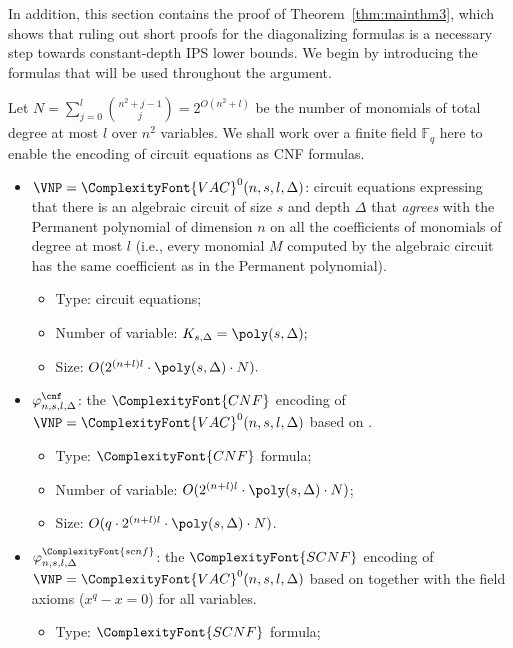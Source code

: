 \documentclass[11pt,letter]{article}
\theoremstyle{remark} %
\newcommand{\CNF}{ %
    {
        \ComplexityFont{CNF}
    }
}
\newcommand{\SCNF}{%
    {
        \ComplexityFont{SCNF}
    }
}
\newcommand{\F}{\mathbb{F}}
\newcommand{\scnf}{
    {
        \ComplexityFont{scnf}
    }
}
\newcommand{\VAC}{
    {
        \ComplexityFont{VAC}
    }
}
\begin{document}
{    In addition, this section contains the proof of Theorem~\ref{thm:mainthm3}, which shows that ruling out short proofs for the diagonalizing formulas is a necessary step towards constant-depth IPS lower bounds. We begin by introducing the formulas that will be used throughout the argument.

Let  $N = \sum_{j=0}^l \binom{n^2+j-1}{j}=2^{O(n^2+l)}$ be the number of monomials of total degree at most $l$ over $n^2$ variables. We shall work over a finite field $\F_q$ here to enable the encoding of circuit equations as CNF formulas.
    
    \begin{itemize}
        \item $\VNP=\VAC^0(n,s,l,\Delta)$: circuit equations expressing that there is an algebraic circuit of size $s$ and depth $\Delta$ that \textit{agrees} with the Permanent polynomial of dimension $n$ on all the coefficients of monomials of degree at most $l$ (i.e., every monomial $M$ computed by the algebraic circuit has the same coefficient as in the Permanent polynomial).       
            \begin{itemize}
                \item Type: circuit equations;
                \item Number of variable: $K_{s, \Delta}=\poly(s, \Delta);$
                \item Size: $O(2^{(n+l)l} \cdot \poly(s, \Delta) \cdot N).$ 
            \end{itemize}
        \item $\varphi_{n,s,l,\Delta}^\cnf$: the $\CNF$ encoding of $\VNP=\VAC^0(n,s,l,\Delta)$ based on .
            \begin{itemize}
                \item Type: $\CNF$ formula;
                \item Number of variable: $O(2^{(n+l)l} \cdot \poly(s, \Delta) \cdot N)$; 
                \item Size: $O(q \cdot 2^{(n+l)l} \cdot \poly(s, \Delta) \cdot N)$. 
            \end{itemize}
        \item $\varphi_{n,s,l,\Delta}^\scnf$: the $\SCNF$ encoding of $\VNP=\VAC^0(n,s,l,\Delta)$ based on  together with the field axioms ($x^q -x =0$) for all variables.
            \begin{itemize}
                \item Type: $\SCNF$ formula;

\end{itemize}
\end{itemize}}
\end{document}

